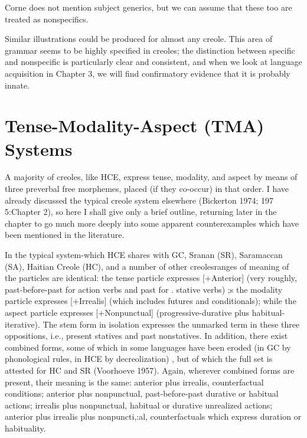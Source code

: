 
Corne does not mention subject generics, but we can assume that these too are treated as nonspecifics.

Similar illustrations could be produced for almost any creole. This area of grammar seems to be highly specified in creoles; the dis\-tinction between specific and nonspecific is particularly clear and consistent, and when we look at language acquisition in Chapter 3, we will find confirmatory evidence that it is probably innate.

\section{Tense-Modality-Aspect (TMA) Systems}

A majority of creoles, like HCE, express tense, modality, and aspect by means of three preverbal free morphemes, placed (if they co-occur) in that order. I have already discussed the typical creole system elsewhere (Bickerton 1974; 197 5:Chapter 2), so here I shall give only a brief outline, returning later in the chapter to go much more deeply into some apparent counterexamples which have been men\-tioned in the literature.

In the typical system-which HCE shares with GC, Sranan (SR), Saramaccan (SA), Haitian Creole (HC), and a number of other creoles\-ranges of meaning of the particles are identical: the tense particle ex\-presses [+Anterior] (very roughly, past-before-past for action verbs and past for . stative verbs) ;s the modality particle expresses [+Irrealis] (which includes futures and conditionals); while the aspect particle expresses [+Nonpunctual] (progressive-durative plus habitual-iterative). The stem form in isolation expresses the unmarked term in these three oppositions, i.e., present statives and past nonstatives. In addition, there exist combined forms, some of which in some languages have been eroded (in GC by phonological rules, in HCE by decreolization) , but of which the full set is attested for HC \citep{Hall1953} and SR (Voor\-hoeve 1957). Again, wherever combined forms are present, their meaning is the same: anterior plus irrealis, counterfactual conditions; anterior plus nonpunctual, past-before-past durative or habitual actions; irrealis plus nonpunctual, habitual or durative unrealized actions; anterior plus irrealis plus nonpuncti,:al, counterfactuals which express duration or habituality.


